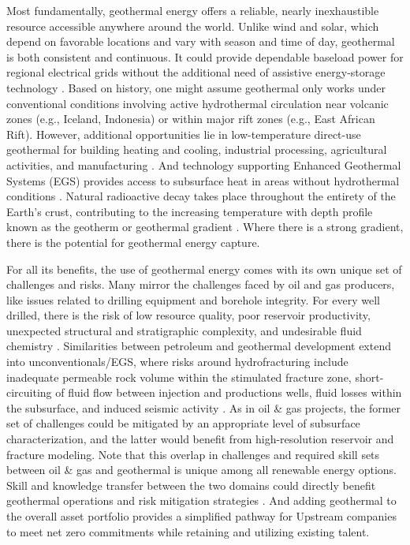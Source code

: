 Most fundamentally, geothermal energy offers a reliable, nearly inexhaustible resource accessible anywhere around the world. Unlike wind and solar, which depend on favorable locations and vary with season and time of day, geothermal is both consistent and continuous. It could provide dependable baseload power for regional electrical grids without the additional need of assistive energy-storage technology \citep{tester_future_2006}. Based on history, one might assume geothermal only works under conventional conditions involving active hydrothermal circulation near volcanic zones (e.g., Iceland, Indonesia) or within major rift zones (e.g., East African Rift). However, additional opportunities lie in low-temperature direct-use geothermal for building heating and cooling, industrial processing, agricultural activities, and manufacturing \citep{glassley_geothermal_2015}. And technology supporting Enhanced Geothermal Systems (EGS) provides access to subsurface heat in areas without hydrothermal conditions \citep{tester_future_2006}. Natural radioactive decay takes place throughout the entirety of the Earth’s crust, contributing to the increasing temperature with depth profile known as the geotherm or geothermal gradient \citep{fowler_solid_2005}. Where there is a strong gradient, there is the potential for geothermal energy capture.

For all its benefits, the use of geothermal energy comes with its own unique set of challenges and risks. Many mirror the challenges faced by oil and gas producers, like issues related to drilling equipment and borehole integrity. For every well drilled, there is the risk of low resource quality, poor reservoir productivity, unexpected structural and stratigraphic complexity, and undesirable fluid chemistry \citep{beckers_low-temperature_2016, hadi_resource_2010}. Similarities between petroleum and geothermal development extend into unconventionals/EGS, where risks around hydrofracturing include inadequate permeable rock volume within the stimulated fracture zone, short-circuiting of fluid flow between injection and productions wells, fluid losses within the subsurface, and induced seismic activity \citep{jelacic_evaluation_2008,pan_establishment_2019}. As in oil \& gas projects, the former set of challenges could be mitigated by an appropriate level of subsurface characterization, and the latter would benefit from high-resolution reservoir and fracture modeling. Note that this overlap in challenges and required skill sets between oil \& gas and geothermal is unique among all renewable energy options. Skill and knowledge transfer between the two domains could directly benefit geothermal operations and risk mitigation strategies \citep{petty_synergies_2009}. And adding geothermal to the overall asset portfolio provides a simplified pathway for Upstream companies to meet net zero commitments while retaining and utilizing existing talent.


